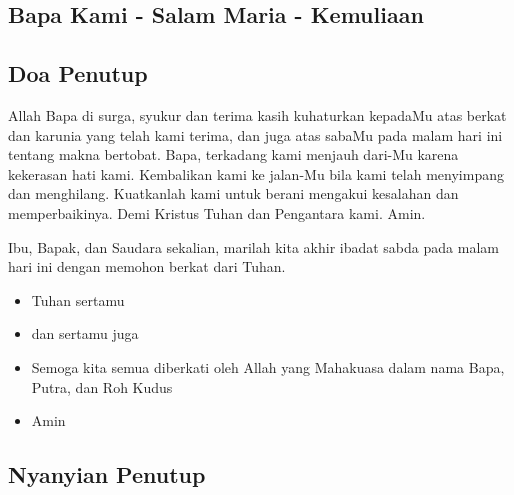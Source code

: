\documentclass[a5paper,headsepline,titlepage,11pt,nnormalheadings,DIVcalc]{scrbook}
\newcommand{\BU}[1]{\begin{itemize} \item[U:] #1 \end{itemize}}
\newcommand{\BP}[1]{\begin{itemize} \item[P:] #1 \end{itemize}}
\begin{document}
\subsection*{Bapa Kami - Salam Maria - Kemuliaan}

\subsection*{Doa Penutup}

Allah Bapa di surga, syukur dan terima kasih kuhaturkan kepadaMu atas berkat dan karunia yang telah kami terima, dan juga atas sabaMu pada malam hari ini tentang makna bertobat. Bapa, terkadang kami menjauh dari-Mu karena kekerasan hati kami. Kembalikan kami ke jalan-Mu bila kami telah menyimpang dan menghilang. Kuatkanlah kami untuk berani mengakui kesalahan dan memperbaikinya. Demi Kristus Tuhan dan Pengantara kami. Amin.
\normalsize

Ibu, Bapak, dan Saudara sekalian, marilah kita akhir ibadat sabda pada malam hari ini dengan memohon berkat dari Tuhan. 
\BP{Tuhan sertamu}
\BU{dan sertamu juga}
\BP{Semoga kita semua diberkati oleh Allah yang Mahakuasa dalam nama Bapa, Putra, dan Roh Kudus}
\BU{Amin}
\subsection*{Nyanyian Penutup}
\end{document}
